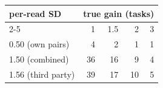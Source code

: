\begin{tabular}{@{}lrrrr@{}}
\toprule
per-read SD & \multicolumn{4}{c}{true gain (tasks)} \\
\cmidrule(l){2-5}
 & 1 & 1.5 & 2 & 3 \\
\midrule
0.50 (own pairs) & 4 & 2 & 1 & 1 \\
1.50 (combined) & 36 & 16 & 9 & 4 \\
1.56 (third party) & 39 & 17 & 10 & 5 \\
\bottomrule
\end{tabular}
